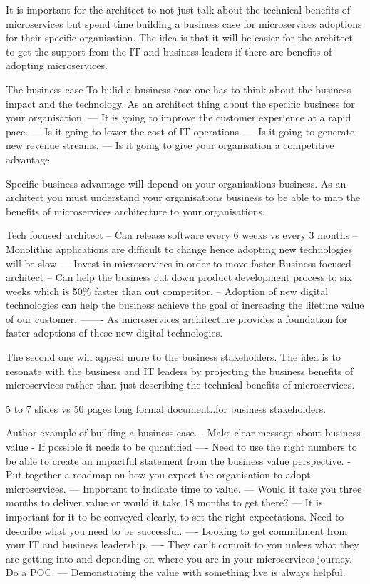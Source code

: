 It is important for the architect to not just talk about the technical benefits of microservices but spend time building a business case for microservices adoptions for their specific organisation.
The idea is that it will be easier for the architect to get the support from the IT and business leaders if there are benefits of adopting microservices.

The business case
To bulid a business case one has to think about the business impact and the technology.
As an architect thing about the specific business for your organisation.
--- It is going to improve the customer experience at a rapid pace.
--- Is it going to lower the cost of IT operations.
--- Is it going to generate new revenue streams.
--- Is it going to give your organisation a competitive advantage

Specific business advantage will depend on your organisations business.
As an architect you must understand your organisations business to be able to map the benefits of microservices architecture to your organisations.

Tech focused architect
-- Can release software every 6 weeks vs every 3 months
-- Monolithic applications are difficult to change hence adopting new technologies will be slow
--- Invest in microservices in order to move faster
Business focused architect
-- Can help the business cut down product development process to six weeks which is 50\% faster than out competitor.
-- Adoption of new digital technologies can help the business achieve the goal of increasing the lifetime value of our customer.
------- As microservices architecture provides a foundation for faster adoptions of these new digital technologies.

The second one will appeal more to the business stakeholders.
The idea is to resonate with the business and IT leaders by projecting the business benefits of microservices rather than just describing the technical benefits of microservices.

5 to 7 slides vs 50 pages long formal document..for business stakeholders.

Author example of building a business case.
- Make clear message about business value
- If possible it needs to be quantified
---- Need to use the right numbers to be able to create an impactful statement from the business value perspective.
- Put together a roadmap on how you expect the organisation to adopt microservices.
--- Important to indicate time to value.
--- Would it take you three months to deliver value or would it take 18 months to get there?
--- It is important for it to be conveyed clearly, to set the right expectations. Need to describe what you need to be successful.
---- Looking to get commitment from your IT and business leadership.
---- They can't commit to you unless what they are getting into and depending on where you are in your microservices journey. Do a POC.
--- Demonstrating the value with something live is always helpful.

